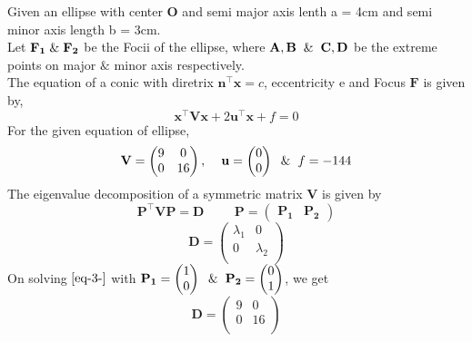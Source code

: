 \documentclass[journal,10pt,twocolumn]{article}
\let\vec\mathbf
\newcommand{\myvec}[1]{\ensuremath{\begin{pmatrix}#1\end{pmatrix}}}
\begin{document}
\raggedright Given an ellipse with center $\vec{O}$ and semi major axis lenth a = 4cm and semi  minor axis length b = 3cm. \vspace{2mm}
\\Let $\vec{F_1} \hspace{1mm} \& \hspace{1mm} \vec{F_2}$ be the Focii of the ellipse, where $\vec{A},\vec{B} \hspace{2mm} \& \hspace{2mm} \vec{C},\vec{D}$ be the extreme points on major $\&$ minor axis respectively. \vspace{2mm}
\\The equation of a conic with diretrix $\vec{n}^{\top}\vec{x} = c$, eccentricity e and Focus $\vec{F}$ is given by,
\begin{equation}
\vec{x}^{\top}\vec{V}\vec{x}+2\vec{u}^{\top}\vec{x}+f=0
\label{eq-1-}
\end{equation}
For the given equation of ellipse,
\begin{equation}
\vec{V} = \begin{pmatrix} 
	9 & 0 \\
	0 & 16 \\
	\end{pmatrix}, \hspace{4mm} \vec{u} = \myvec{0 \\ 0} \hspace{2mm} \& \hspace{2mm} f = -144
\label{eq-2-}
\end{equation}
The eigenvalue decomposition of a symmetric matrix $\vec{V}$ is given by
\begin{equation}
\vec{P}^{\top}\vec{V}\vec{P} = \vec{D} \hspace{1cm} 
\vec{P} = \myvec{\vec{P_1} & \vec{P_2}} 
\label{eq-3-}
\end{equation}
\begin{equation}
\vec{D} = \begin{pmatrix} 
	\lambda_1 & 0 \\
	0 & \lambda_2 \\
	\end{pmatrix} 
\label{eq-4-}
\end{equation}
On solving $\eqref{eq-3-}$ with $\vec{P_1} = \myvec{1 \\ 0} \hspace{2mm} \& \hspace{2mm} \vec{P_2} = \myvec{0 \\ 1}$, we get
\begin{equation}
\vec{D} = \begin{pmatrix} 
	9 & 0 \\
	0 & 16 \\
	\end{pmatrix}
\label{eq-5-}
\end{equation}
\end{document}
